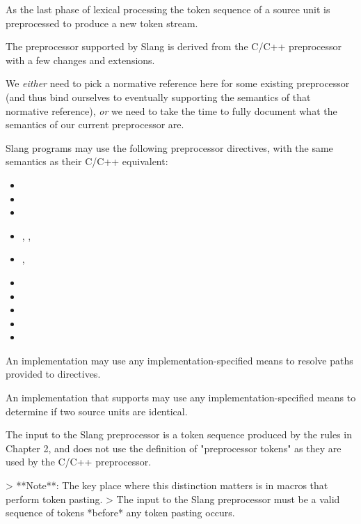 
As the last phase of lexical processing the token sequence of a source unit is preprocessed to produce a new token stream.

The preprocessor supported by Slang is derived from the C/C++ preprocessor with a few changes and extensions.

\begin{Incomplete}
We \emph{either} need to pick a normative reference here for some existing preprocessor (and thus bind ourselves to eventually supporting the semantics of that normative reference), \emph{or} we need to take the time to fully document what the semantics of our current preprocessor are.
\end{Incomplete}

Slang programs may use the following preprocessor directives, with the same semantics as their C/C++ equivalent:

\begin{itemize}
\item {}
\item {}
\item {}
\item {}, , 
\item {}, 
\item {}
\item {}
\item {}
\item {}
\item {}
\end{itemize}

An implementation may use any implementation-specified means to resolve paths provided to  directives.

An implementation that supports  may use any implementation-specified means to determine if two source units are identical.


The input to the Slang preprocessor is a token sequence produced by the rules in Chapter 2, and does not use the definition of "preprocessor tokens" as they are used by the C/C++ preprocessor.

> **Note**: The key place where this distinction matters is in macros that perform token pasting.
> The input to the Slang preprocessor must be a valid sequence of tokens *before* any token pasting occurs.

